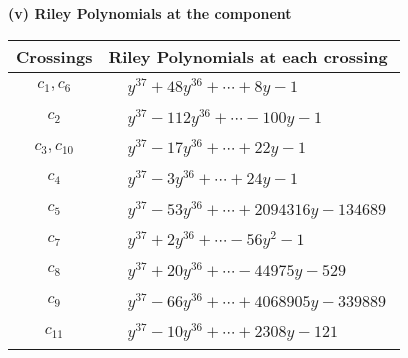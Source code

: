 \documentclass[1p]{elsarticle_modified}
\theoremstyle{definition}
\begin{document}
\newpage\renewcommand{\arraystretch}{1}
\flushleft \textbf{(v) Riley Polynomials at the component}\newline \\
\begin{tabular}{m{50pt}|m{274pt}}
Crossings & \hspace{64pt}Riley Polynomials at each crossing \\
\hline $$\begin{aligned}c_{1},c_{6}\end{aligned}$$&$\begin{aligned}
&y^{37}+48 y^{36}+\cdots+8 y-1
\end{aligned}$\\
\hline $$\begin{aligned}c_{2}\end{aligned}$$&$\begin{aligned}
&y^{37}-112 y^{36}+\cdots-100 y-1
\end{aligned}$\\
\hline $$\begin{aligned}c_{3},c_{10}\end{aligned}$$&$\begin{aligned}
&y^{37}-17 y^{36}+\cdots+22 y-1
\end{aligned}$\\
\hline $$\begin{aligned}c_{4}\end{aligned}$$&$\begin{aligned}
&y^{37}-3 y^{36}+\cdots+24 y-1
\end{aligned}$\\
\hline $$\begin{aligned}c_{5}\end{aligned}$$&$\begin{aligned}
&y^{37}-53 y^{36}+\cdots+2094316 y-134689
\end{aligned}$\\
\hline $$\begin{aligned}c_{7}\end{aligned}$$&$\begin{aligned}
&y^{37}+2 y^{36}+\cdots-56 y^2-1
\end{aligned}$\\
\hline $$\begin{aligned}c_{8}\end{aligned}$$&$\begin{aligned}
&y^{37}+20 y^{36}+\cdots-44975 y-529
\end{aligned}$\\
\hline $$\begin{aligned}c_{9}\end{aligned}$$&$\begin{aligned}
&y^{37}-66 y^{36}+\cdots+4068905 y-339889
\end{aligned}$\\
\hline $$\begin{aligned}c_{11}\end{aligned}$$&$\begin{aligned}
&y^{37}-10 y^{36}+\cdots+2308 y-121
\end{aligned}$\\
\hline
\end{tabular}\\~\\
\end{document}
